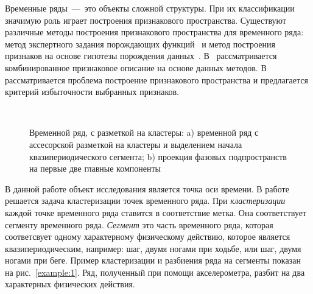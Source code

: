 \documentclass[12pt, twoside]{article}
\numberwithin{equation}{section}
\begin{document}
Временные ряды~---~это объекты сложной структуры. При их классификации значимую роль играет построения признакового пространства. Существуют различные методы построения признакового пространства для временного ряда: метод экспертного задания порождающих функций~\cite{kwapisz2010} и метод построения признаков на основе гипотезы порождения данных~\cite{lukashin2003}. В~\cite{Ivkin2015} рассматривается комбинированное признаковое описание на основе данных методов. В~\cite{Katrutsa2015} рассматривается проблема построение признакового пространства и предлагается критерий избыточности выбранных признаков.
\begin{figure}[h!t]\center
{}
\\
\caption{Временной ряд, с разметкой на кластеры: a) временной ряд с ассесорской разметкой на кластеры и выделением начала квазипериодического сегмента; b) проекция фазовых подпространств на первые две главные компоненты }
\end{figure}

В данной работе объект исследования является точка оси времени. В работе решается задача кластеризации точек временного ряда. При \textit{кластеризации} каждой точке временного ряда ставится в соответствие метка. Она соответствует сегменту временного ряда. \textit{Сегмент} это часть временного ряда, которая соответсвует одному характерному физическому действию, которое является квазипериодическим, например: шаг, двумя ногами при ходьбе, или шаг, двумя ногами при беге. Пример кластеризации и разбиения ряда на сегменты показан на  рис.~\ref{example:1}. Ряд, полученный при помощи акселерометра, разбит на два характерных физических действия.
\end{document}
